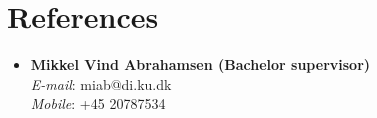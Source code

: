 \documentclass[11pt]{article}
\newcommand{\resumeSubHeadingListStart}{\begin{itemize}[leftmargin=*]}
\newcommand{\resumeSubHeadingListEnd}{\end{itemize}}
\begin{document}
\section{References}
  \resumeSubHeadingListStart
      \item\small{
        \textbf{Mikkel Vind Abrahamsen (Bachelor supervisor)}{
            \\\hspace{10pt}\textit{E-mail}: miab@di.ku.dk\\\hspace{10pt}\textit{Mobile}: +45 20787534
        \vspace{-2pt}}
      }\vspace{-4pt}
 \resumeSubHeadingListEnd

\end{document}
